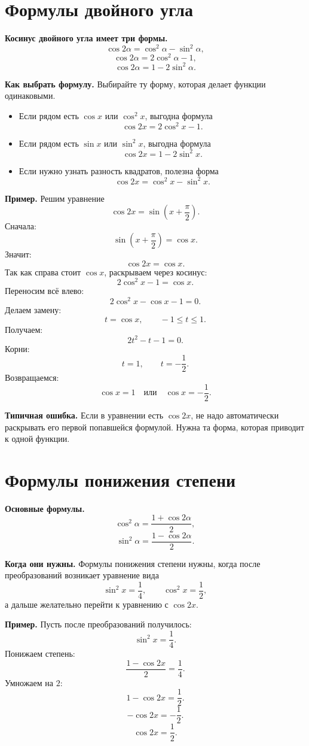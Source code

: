 \documentclass[a4paper,12pt]{article}
\newcommand{\sectionline}{\vspace{1mm}{\color{accent}\hrule height 0.6pt}\vspace{2mm}}
\newcommand{\important}[1]{\textcolor{darkaccent}{\textbf{#1}}}
\newcommand{\warning}[1]{\textcolor{warn}{\textbf{#1}}}
\begin{document}
\section{Формулы двойного угла}
\sectionline

\important{Косинус двойного угла имеет три формы.}
\[
\cos 2\alpha=\cos^2\alpha-\sin^2\alpha,
\]
\[
\cos 2\alpha=2\cos^2\alpha-1,
\]
\[
\cos 2\alpha=1-2\sin^2\alpha.
\]

\important{Как выбрать формулу.}
Выбирайте ту форму, которая делает функции одинаковыми.

\begin{itemize}
\item Если рядом есть \(\cos x\) или \(\cos^2x\), выгодна формула
\[
\cos 2x=2\cos^2x-1.
\]
\item Если рядом есть \(\sin x\) или \(\sin^2x\), выгодна формула
\[
\cos 2x=1-2\sin^2x.
\]
\item Если нужно узнать разность квадратов, полезна форма
\[
\cos 2x=\cos^2x-\sin^2x.
\]
\end{itemize}

\important{Пример.}
Решим уравнение
\[
\cos 2x=\sin\left(x+\frac{\pi}{2}\right).
\]
Сначала:
\[
\sin\left(x+\frac{\pi}{2}\right)=\cos x.
\]
Значит:
\[
\cos 2x=\cos x.
\]
Так как справа стоит \(\cos x\), раскрываем через косинус:
\[
2\cos^2x-1=\cos x.
\]
Переносим всё влево:
\[
2\cos^2x-\cos x-1=0.
\]
Делаем замену:
\[
t=\cos x,\qquad -1\le t\le1.
\]
Получаем:
\[
2t^2-t-1=0.
\]
Корни:
\[
t=1,\qquad t=-\frac12.
\]
Возвращаемся:
\[
\cos x=1
\quad\text{или}\quad
\cos x=-\frac12.
\]

\warning{Типичная ошибка.}
Если в уравнении есть \(\cos 2x\), не надо автоматически раскрывать его первой попавшейся формулой. Нужна та форма, которая приводит к одной функции.

\section{Формулы понижения степени}
\sectionline

\important{Основные формулы.}
\[
\cos^2\alpha=\frac{1+\cos 2\alpha}{2},
\]
\[
\sin^2\alpha=\frac{1-\cos 2\alpha}{2}.
\]

\important{Когда они нужны.}
Формулы понижения степени нужны, когда после преобразований возникает уравнение вида
\[
\sin^2x=\frac14,
\qquad
\cos^2x=\frac12,
\]
а дальше желательно перейти к уравнению с \(\cos 2x\).

\important{Пример.}
Пусть после преобразований получилось:
\[
\sin^2x=\frac14.
\]
Понижаем степень:
\[
\frac{1-\cos 2x}{2}=\frac14.
\]
Умножаем на \(2\):
\[
1-\cos 2x=\frac12.
\]
\[
-\cos 2x=-\frac12.
\]
\[
\cos 2x=\frac12.
\]
\end{document}
